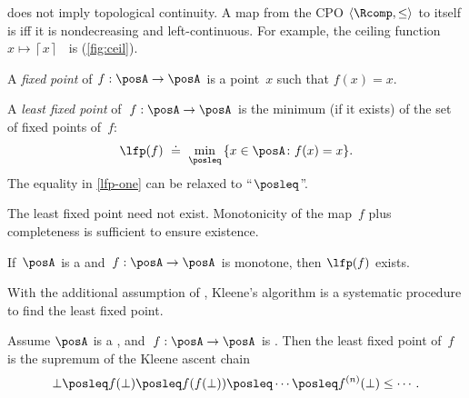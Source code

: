 \begin{remark}
\scottcontinuity does not imply topological continuity. A map from
the CPO $\langle\Rcomp,\leq\rangle$ to itself is \scottcontinuous
iff it is nondecreasing and left-continuous. For example, the ceiling
function $x\mapsto\left\lceil x\right\rceil $~ is \scottcontinuous
(\cref{fig:ceil}).
\end{remark}

\emph{}

A \emph{fixed} \emph{point} of $f:\posA\rightarrow\posA$ is a point~$x$
such that $f(x)=x$. 
\begin{definition}
A \emph{least fixed point} of~$f:\posA\rightarrow\posA$ is the minimum
(if it exists) of the set of fixed points of~$f$:
\begin{equation}
\lfp(f)\,\,\doteq\,\,\min_{\posleq}\,\{x\in\posA\colon f(x)=x\}.\label{eq:lfp-one}
\end{equation}
The equality in \eqref{lfp-one} can be relaxed to ``$\posleq$''.
\end{definition}
The least fixed point need not exist. Monotonicity of the map~$f$
plus completeness is sufficient to ensure existence.
\begin{lemma}
\label{lem:CPO-fix-point-2}If~$\posA$ is a \CPO and~$f:\posA\rightarrow\posA$
is monotone, then $\lfp(f)$ exists.
\end{lemma}


With the additional assumption of \scottcontinuity, Kleene's algorithm
is a systematic procedure to find the least fixed point.
\begin{lemma}
\label{lem:kleene-1}Assume $\posA$ is a \CPO, and~$f:\posA\rightarrow\posA$
is \scottcontinuous. Then the least fixed point of~$f$ is the supremum
of the Kleene ascent chain 
\[
\bot\posleq f(\bot)\posleq f(f(\bot))\posleq\cdots\posleq f^{(n)}(\bot)\leq\cdots.
\]
\end{lemma}









